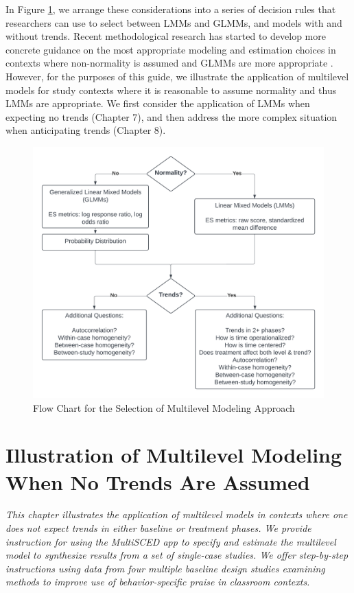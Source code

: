 \documentclass[
]{book}
\begin{document}
In Figure \ref{fig:mlmapproach}, we arrange these considerations into a series of decision rules that researchers can use to select between LMMs and GLMMs, and models with and without trends.
Recent methodological research has started to develop more concrete guidance on the most appropriate modeling and estimation choices in contexts where non-normality is assumed and GLMMs are more appropriate \citep{Li_Luo_Baek_Thompson_Lam_2023}.
However, for the purposes of this guide, we illustrate the application of multilevel models for study contexts where it is reasonable to assume normality and thus LMMs are appropriate.
We first consider the application of LMMs when expecting no trends (Chapter 7), and then address the more complex situation when anticipating trends (Chapter 8).

\begin{figure}
\includegraphics[width=16.34in]{images/flowchart_MLMApproach} \caption{Flow Chart for the Selection of Multilevel Modeling Approach}\label{fig:mlmapproach}
\end{figure}

\hypertarget{MLM-NoTrend}{%
\chapter{Illustration of Multilevel Modeling When No Trends Are Assumed}\label{MLM-NoTrend}}

\emph{This chapter illustrates the application of multilevel models in contexts where one does not expect trends in either baseline or treatment phases. We provide instruction for using the MultiSCED app to specify and estimate the multilevel model to synthesize results from a set of single-case studies. We offer step-by-step instructions using data from four multiple baseline design studies examining methods to improve use of behavior-specific praise in classroom contexts.}
\end{document}
